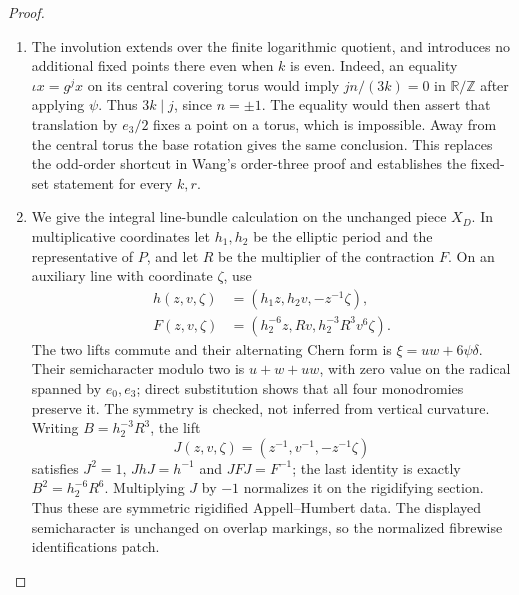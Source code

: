 \begin{proof}
\begin{enumerate}[label=\arabic*.,leftmargin=*]
\item The involution extends over the finite logarithmic quotient,
and introduces no additional fixed points there even when $k$
is even. Indeed, an equality $\iota x=g^j x$ on its central
covering torus would imply $jn/(3k)=0$ in $\mathbb R/\mathbb Z$
after applying $\psi$. Thus $3k\mid j$, since $n=\pm1$.
The equality would then assert that translation by $e_3/2$
fixes a point on a torus, which is impossible. Away from the
central torus the base rotation gives the same conclusion.
This replaces the odd-order shortcut in Wang's order-three
proof and establishes the fixed-set statement for every $k,r$.

\item We give the integral line-bundle calculation on the unchanged
piece $X_D$. In multiplicative coordinates let $h_1,h_2$ be
the elliptic period and the representative of $P$, and let $R$
be the multiplier of the contraction $F$. On an auxiliary line
with coordinate $\zeta$, use
\[
 \begin{aligned}
 h(z,v,\zeta)&=(h_1z,h_2v,-z^{-1}\zeta),\\
 F(z,v,\zeta)&=(h_2^{-6}z,Rv,h_2^{-3}R^3v^6\zeta).
 \end{aligned}
\]
The two lifts commute and their alternating Chern form is
$\xi=uw+6\psi\delta$. Their semicharacter modulo two is
$u+w+uw$, with zero value on the radical spanned by $e_0,e_3$;
direct substitution shows that all four monodromies preserve it.
The symmetry is checked, not inferred from vertical curvature.
Writing $B=h_2^{-3}R^3$, the lift
\[
 J(z,v,\zeta)=(z^{-1},v^{-1},-z^{-1}\zeta)
\]
satisfies $J^2=1$, $JhJ=h^{-1}$ and $JFJ=F^{-1}$;
the last identity is exactly $B^2=h_2^{-6}R^6$.
Multiplying $J$ by $-1$ normalizes it on the rigidifying section.
Thus these are symmetric rigidified Appell--Humbert data.
The displayed semicharacter is unchanged on overlap markings,
so the normalized fibrewise identifications patch.


\end{enumerate}
\end{proof}
